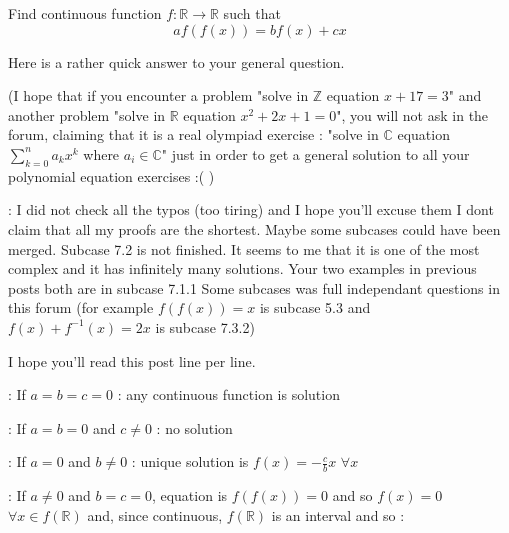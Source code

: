 \begin{solution}
	\begin{tcolorbox}Find continuous function $f:\mathbb{R} \to \mathbb{R}$ such that
\[a f(f(x)) = b f(x) + cx\]\end{tcolorbox}
Here is a rather quick answer to your general question.

(I hope that if you encounter a problem "solve in $\mathbb Z$ equation $x+17=3$" and another problem "solve in $\mathbb R$ equation $x^2+2x+1=0$", you will not ask in the forum, claiming that it is a real olympiad exercise : "solve in $\mathbb C$ equation $\sum_{k=0}^na_kx^k$ where $a_i\in\mathbb C$" just in order to get a general solution to all your polynomial equation exercises :( )


 :
I did not check all the typos (too tiring) and I hope you'll excuse them
I dont claim that all my proofs are the shortest.
Maybe some subcases could have been merged.
Subcase 7.2 is not finished. It seems to me that it is one of the most complex and it has infinitely many solutions.
Your two examples in previous posts both are in subcase 7.1.1
Some subcases was full independant questions in this forum (for example $f(f(x))=x$ is subcase 5.3 and $f(x)+f^{-1}(x)=2x$ is subcase 7.3.2)

I hope you'll read this post line per line.



 : If $a=b=c=0$ : any continuous function is solution

 : If $a=b=0$ and $c\ne 0$ : no solution

: If $a=0$ and $b\ne 0$ : unique solution is $f(x)=-\frac cbx$ $\forall x$

 : If $a\ne 0$ and $b=c=0$, equation is $f(f(x))=0$ and so $f(x)=0$ $\forall x\in f(\mathbb R)$ and, since continuous, $f(\mathbb R)$ is an interval and so : 


\end{solution}

